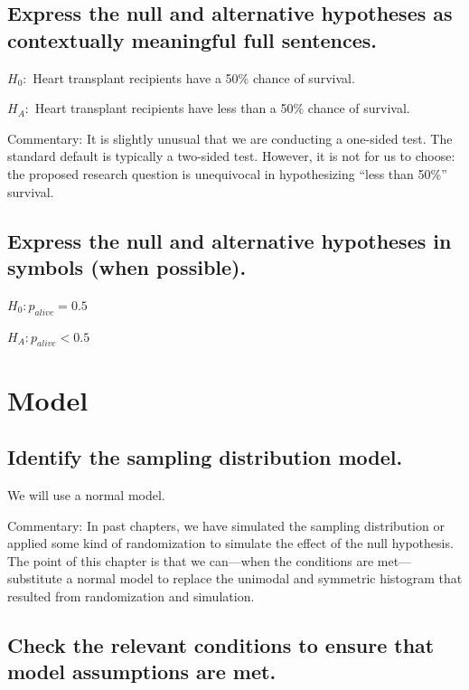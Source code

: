 \documentclass[
]{book}
\begin{document}
\hypertarget{one-prop-ex-express-words}{%
\subsection{Express the null and alternative hypotheses as contextually meaningful full sentences.}\label{one-prop-ex-express-words}}

\(H_{0}:\) Heart transplant recipients have a 50\% chance of survival.

\(H_{A}:\) Heart transplant recipients have less than a 50\% chance of survival.

Commentary: It is slightly unusual that we are conducting a one-sided test. The standard default is typically a two-sided test. However, it is not for us to choose: the proposed research question is unequivocal in hypothesizing ``less than 50\%'' survival.

\hypertarget{one-prop-ex-express-math}{%
\subsection{Express the null and alternative hypotheses in symbols (when possible).}\label{one-prop-ex-express-math}}

\(H_{0}: p_{alive} = 0.5\)

\(H_{A}: p_{alive} < 0.5\)

\hypertarget{one-prop-ex-model}{%
\section{Model}\label{one-prop-ex-model}}

\hypertarget{one-prop-ex-sampling-dist-model}{%
\subsection{Identify the sampling distribution model.}\label{one-prop-ex-sampling-dist-model}}

We will use a normal model.

Commentary: In past chapters, we have simulated the sampling distribution or applied some kind of randomization to simulate the effect of the null hypothesis. The point of this chapter is that we can---when the conditions are met---substitute a normal model to replace the unimodal and symmetric histogram that resulted from randomization and simulation.

\hypertarget{one-prop-ex-ht-conditions}{%
\subsection{Check the relevant conditions to ensure that model assumptions are met.}\label{one-prop-ex-ht-conditions}}
\end{document}
